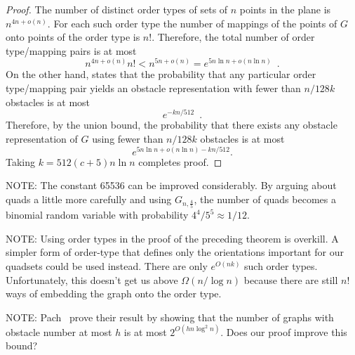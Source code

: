 \documentclass{patmorin}
\begin{document}
\begin{proof}
    The number of distinct order types of sets of $n$ points in the plane
  is $n^{4n+o(n)}$.  For each such order type the number of mappings of 
  the points of $G$ onto points of the order type is $n!$.  Therefore, the
  total number of order type/mapping pairs is at most
  \[
    n^{4n+o(n)}n! < n^{5n+o(n)} = e^{5n\ln n+o(n\ln n)} \enspace .
  \]
  On the other hand,  states that the probability that
  any particular order type/mapping pair yields an obstacle representation
  with fewer than $n/128k$ obstacles is at most
  \[
     e^{-kn/512} \enspace .
  \]
  Therefore, by the union bound, the probability that there exists any
  obstacle representation of $G$ using fewer than $n/128k$ obstacles is
  at most
  \[
     e^{5n\ln n+o(n\ln n)-kn/512} .
  \]
  Taking $k=512(c+5)n\ln n$ completes proof.
\end{proof}

NOTE: The constant 65536 can be improved considerably.  By arguing about
quads a little more carefully and using $G_{n,\frac{4}{5}}$,
the number of quads becomes a binomial random variable with probability
$4^4/5^5\approx 1/12$.

NOTE: Using order types in the proof of the preceding theorem is overkill.
A simpler form of order-type that defines only the orientations important
for our quadsets could be used instead.  There are only $e^{O(nk)}$ such
order types.  Unfortunately, this doesn't get us above $\Omega(n/\log
n)$ because there are still $n!$ ways of embedding the graph onto the
order type.

NOTE: Pach \etal\ prove their result by showing that the number of
graphs with obstacle number at most $h$ is at most $2^{O(hn\log^2 n)}$.
Does our proof improve this bound?
\end{document}
